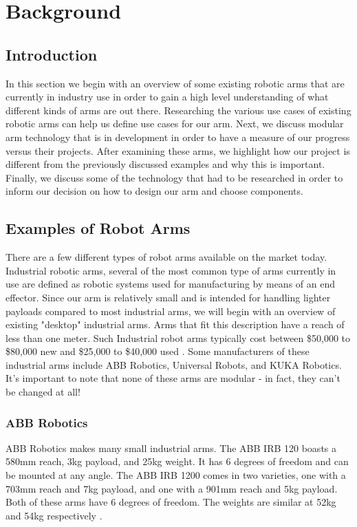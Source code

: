 \section{Background}
\subsection{Introduction}
In this section we begin with an overview of some existing robotic arms that are currently in industry use in order to gain a high level understanding of what different kinds of arms are out there. Researching the various use cases of existing robotic arms can help us define use cases for our arm. Next, we discuss modular arm technology that is in development in order to have a measure of our progress versus their projects. After examining these arms, we highlight how our project is different from the previously discussed examples and why this is important. Finally, we discuss some of the technology that had to be researched in order to inform our decision on how to design our arm and choose components.

\subsection{Examples of Robot Arms}
There are a few different types of robot arms available on the market today.  Industrial robotic arms, several of the most common type of arms currently in use are defined as robotic systems used for manufacturing by means of an end effector. Since our arm is relatively small and is intended for handling lighter payloads compared to most industrial arms, we will begin with an overview of existing "desktop" industrial arms. Arms that fit this description have a reach of less than one meter. Such Industrial robot arms typically cost between \$50,000 to \$80,000 new and \$25,000 to \$40,000 used \cite{RobotWorx}. Some manufacturers of these industrial arms include ABB Robotics, Universal Robots, and KUKA Robotics. It's important to note that none of these arms are modular - in fact, they can't be changed at all!

\subsubsection{ABB Robotics}
ABB Robotics makes many small industrial arms. The ABB IRB 120 boasts a 580mm reach, 3kg payload, and 25kg weight. It has 6 degrees of freedom and can be mounted at any angle. The ABB IRB 1200 comes in two varieties, one with a 703mm reach and 7kg payload, and one with a 901mm reach and 5kg payload. Both of these arms have 6 degrees of freedom. The weights are similar at 52kg and 54kg respectively \cite{RobotWorx}.

